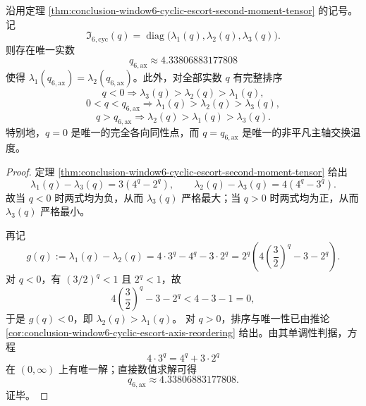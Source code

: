 \begin{corollary}\label{cor:conclusion-window6-cyclic-escort-full-axis-ordering}
沿用定理 \ref{thm:conclusion-window6-cyclic-escort-second-moment-tensor} 的记号。记
\[
\mathfrak I_{6,\mathrm{cyc}}(q)=
\operatorname{diag}\bigl(\lambda_1(q),\lambda_2(q),\lambda_3(q)\bigr).
\]
则存在唯一实数
\[
q_{6,\mathrm{ax}}\approx 4.33806883177808
\]
使得 \(\lambda_1(q_{6,\mathrm{ax}})=\lambda_2(q_{6,\mathrm{ax}})\)。此外，对全部实数 \(q\) 有完整排序
\[
q<0
\Longrightarrow
\lambda_3(q)>\lambda_2(q)>\lambda_1(q),
\]
\[
0<q<q_{6,\mathrm{ax}}
\Longrightarrow
\lambda_1(q)>\lambda_2(q)>\lambda_3(q),
\]
\[
q>q_{6,\mathrm{ax}}
\Longrightarrow
\lambda_2(q)>\lambda_1(q)>\lambda_3(q).
\]
特别地，\(q=0\) 是唯一的完全各向同性点，而 \(q=q_{6,\mathrm{ax}}\) 是唯一的非平凡主轴交换温度。
\end{corollary}
\begin{proof}
定理 \ref{thm:conclusion-window6-cyclic-escort-second-moment-tensor} 给出
\[
\lambda_1(q)-\lambda_3(q)=3(4^q-2^q),
\qquad
\lambda_2(q)-\lambda_3(q)=4(4^q-3^q).
\]
故当 \(q<0\) 时两式均为负，从而 \(\lambda_3(q)\) 严格最大；当 \(q>0\) 时两式均为正，从而 \(\lambda_3(q)\) 严格最小。

再记
\[
g(q):=\lambda_1(q)-\lambda_2(q)=4\cdot 3^q-4^q-3\cdot 2^q
=
2^q\!\left(4\left(\frac32\right)^q-3-2^q\right).
\]
对 \(q<0\)，有 \((3/2)^q<1\) 且 \(2^q<1\)，故
\[
4\left(\frac32\right)^q-3-2^q<4-3-1=0,
\]
于是 \(g(q)<0\)，即 \(\lambda_2(q)>\lambda_1(q)\)。
对 \(q>0\)，排序与唯一性已由推论
\ref{cor:conclusion-window6-cyclic-escort-axis-reordering} 给出。由其单调性判据，方程
\[
4\cdot 3^q=4^q+3\cdot 2^q
\]
在 \((0,\infty)\) 上有唯一解；直接数值求解可得
\[
q_{6,\mathrm{ax}}\approx 4.33806883177808.
\]
证毕。
\end{proof}

